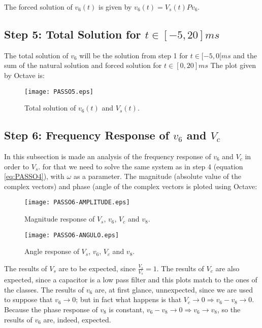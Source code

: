 The forced solution of $v_6(t)$ is given by $v_6(t) = V_s(t)Pv_6$.
\newpage
\subsection{Step 5: Total Solution for $t\in [-5,20]ms$}

The total solution of $v_6$ will be the solution from step 1 for $t\in [-5,0[ms$ and the sum of the natural solution and forced solution for $t\in [0,20]ms$
The plot given by Octave is:

\begin{figure}[h] \centering
\texttt{[image: PASSO5.eps]}
\caption{Total solution of $v_6(t)$ and $V_s(t)$.}
\label{fig:TEO_TOT_SOL}
\end{figure}

\newpage
\subsection{Step 6: Frequency Response of $v_6$ and $V_c$}

In this subsection is made an analysis of the frequency response of $v_6$ and $V_c$ in order to $V_s$. for that we need to solve the same system as in step 4 (equation \ref{eq:PASSO4}), with $\omega$ as a parameter. The magnitude (absolute value of the complex vectors) and phase (angle of the complex vectors is ploted using Octave:

\begin{figure}[h] \centering
\texttt{[image: PASSO6-AMPLITUDE.eps]}
\caption{Magnitude response of $V_s$, $v_6$, $V_c$ and $v_8$.}
\label{fig:TEO_MAG}
\end{figure}

\begin{figure}[h] \centering
\texttt{[image: PASSO6-ANGULO.eps]}
\caption{Angle response of $V_s$, $v_6$, $V_c$ and $v_8$.}
\label{fig:TEO_ANG}
\end{figure}

The results of $V_s$ are to be expected, since $\frac{V_s}{V_s}=1$.
The results of $V_c$ are also expected, since a capacitor is a low pass filter and this plots match to the ones of the classes.
The results of $v_6$ are, at first glance, unnexpected, since we are used to suppose that $v_6 \to 0$; but in fact what happens is that $V_c \to 0 \Rightarrow v_6 - v_8 \to 0$. Because the phase response of $v_8$ is constant, $v_6 - v_8 \to 0 \Rightarrow v_6 \to v_8$, so the results of $v_6$ are, indeed, expected.




